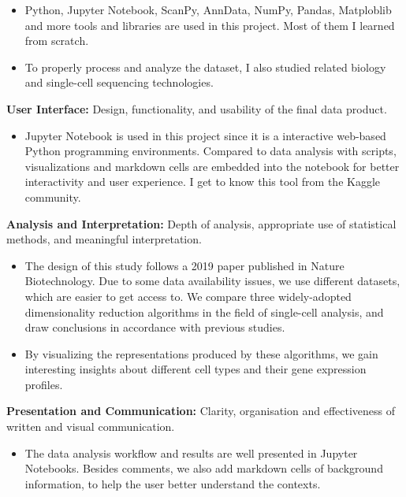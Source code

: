 \documentclass[a4paper, 12pt]{article}
\begin{document}
\begin{itemize}
    \item Python, Jupyter Notebook, ScanPy, AnnData, NumPy, Pandas, Matploblib and more tools and libraries are used in this project. Most of them I learned from scratch.
    \item To properly process and analyze the dataset, I also studied related biology and single-cell sequencing technologies.
\end{itemize}

\textbf{User Interface:} Design, functionality, and usability of the final data product.

\begin{itemize}
    \item Jupyter Notebook is used in this project since it is a interactive web-based Python programming environments. Compared to data analysis with scripts, visualizations and markdown cells are embedded into the notebook for better interactivity and user experience. I get to know this tool from the Kaggle community.
\end{itemize}

\textbf{Analysis and Interpretation:} Depth of analysis, appropriate use of statistical methods, and meaningful interpretation.

\begin{itemize}
    \item The design of this study follows a 2019 paper published in Nature Biotechnology. Due to some data availability issues, we use different datasets, which are easier to get access to. We compare three widely-adopted dimensionality reduction algorithms in the field of single-cell analysis, and draw conclusions in accordance with previous studies.
    \item By visualizing the representations produced by these algorithms, we gain interesting insights about different cell types and their gene expression profiles. 
\end{itemize}

\textbf{Presentation and Communication:} Clarity, organisation and effectiveness of written and visual communication.

\begin{itemize}
    \item The data analysis workflow and results are well presented in Jupyter Notebooks. Besides comments, we also add markdown cells of background information, to help the user better understand the contexts.
\end{itemize}
\end{document}
